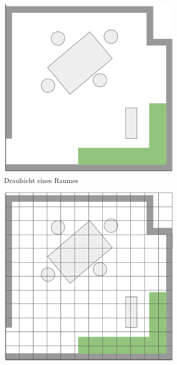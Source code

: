 \begin{figure}
  \begin{subfigure}[t]{.3\textwidth}
    \centering
    \includegraphics[width=.9\linewidth]{pic/vorwissen/2a_karte.png}
    \caption{Draufsicht eines Raumes}
  \end{subfigure}\hfill
  \begin{subfigure}[t]{.3\textwidth}
    \centering
    \includegraphics[width=.9\linewidth]{pic/vorwissen/2b_kartengitter.png}

\end{subfigure}
\end{figure}
